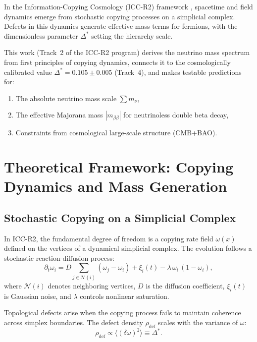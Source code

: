 \documentclass[11pt,a4paper]{article}
\newcommand{\DeltaStar}{\Delta^{\ast}}
\begin{document}
In the Information-Copying Cosmology (ICC-R2) framework \cite{gimranov2026roadmap}, spacetime and field dynamics emerge from stochastic copying processes on a simplicial complex. Defects in this dynamics generate effective mass terms for fermions, with the dimensionless parameter $\DeltaStar$ setting the hierarchy scale.

This work (Track~2 of the ICC-R2 program) derives the neutrino mass spectrum from first principles of copying dynamics, connects it to the cosmologically calibrated value $\DeltaStar = 0.105 \pm 0.005$ (Track~4), and makes testable predictions for:
\begin{enumerate}[label=\arabic*.]
    \item The absolute neutrino mass scale $\sum m_\nu$,
    \item The effective Majorana mass $|m_{\beta\beta}|$ for neutrinoless double beta decay,
    \item Constraints from cosmological large-scale structure (CMB+BAO).
\end{enumerate}

\section{Theoretical Framework: Copying Dynamics and Mass Generation}
\label{sec:theory}

\subsection{Stochastic Copying on a Simplicial Complex}
\label{subsec:copying}

In ICC-R2, the fundamental degree of freedom is a copying rate field $\omega(x)$ defined on the vertices of a dynamical simplicial complex. The evolution follows a stochastic reaction-diffusion process:
\begin{equation}
\partial_t \omega_i = D \sum_{j \in \mathcal{N}(i)} (\omega_j - \omega_i) + \xi_i(t) - \lambda \, \omega_i \, (1 - \omega_i),
\end{equation}
where $\mathcal{N}(i)$ denotes neighboring vertices, $D$ is the diffusion coefficient, $\xi_i(t)$ is Gaussian noise, and $\lambda$ controls nonlinear saturation.

Topological defects arise when the copying process fails to maintain coherence across simplex boundaries. The defect density $\rho_{\text{def}}$ scales with the variance of $\omega$:
\begin{equation}
\rho_{\text{def}} \propto \langle (\delta \omega)^2 \rangle \equiv \DeltaStar.
\end{equation}
\end{document}
